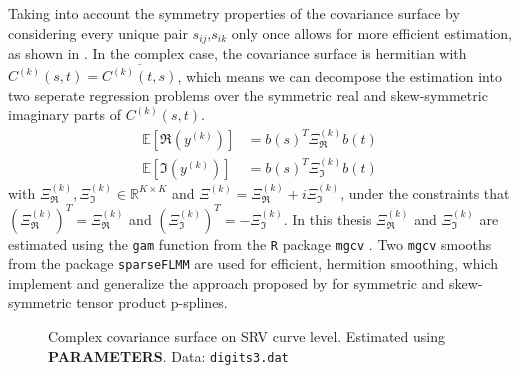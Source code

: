 Taking into account the symmetry properties of the covariance surface by considering every unique pair $s_{ij}$,$s_{ik}$ only once allows for more efficient estimation, as shown in \cite{CederbaumScheiplGreven2018}. 
In the complex case, the covariance surface is hermitian with $C^{(k)}(s,t) = \overline{C^{(k)}(t,s)}$, which means we can decompose the estimation into two seperate regression problems over the symmetric real and skew-symmetric imaginary parts of $C^{(k)}(s,t)$.
\begin{align}
  \mathbb{E}[\Re(y^{(k)})] &= b(s)^T \Xi^{(k)}_{\Re} b(t) \\
  \mathbb{E}[\Im(y^{(k)})] &= b(s)^T \Xi^{(k)}_{\Im} b(t)
\end{align}
with $\Xi^{(k)}_\Re, \Xi^{(k)}_\Im \in \mathbb{R}^{K\times K}$ and $\Xi^{(k)} = \Xi^{(k)}_\Re + i \Xi^{(k)}_\Im$, under the constraints that $(\Xi^{(k)}_\Re)^T = \Xi^{(k)}_\Re$ and $(\Xi^{(k)}_\Im)^T = - \Xi^{(k)}_\Im$.
In this thesis  $\Xi^{(k)}_\Re$ and $\Xi^{(k)}_\Im$ are estimated using the \texttt{gam} function from the \texttt{R} package \texttt{mgcv} \parencite{Wood2017}.
Two \texttt{mgcv} smooths from the package \texttt{sparseFLMM} \parencite{sparseFLMM} are used for efficient, hermition smoothing, which implement and generalize the approach proposed by \cite{CederbaumScheiplGreven2018} for symmetric and skew-symmetric tensor product p-splines.

\begin{figure}
  \centering
  \begin{subfigure}{.48\textwidth}
    \centering
  \end{subfigure}\hfill%
  \begin{subfigure}{.48\textwidth}
    \centering
  \end{subfigure}
  \caption{Complex covariance surface on SRV curve level. Estimated using \textbf{PARAMETERS}. Data: \texttt{digits3.dat}}
  \label{fig:3-cov}
\end{figure}


